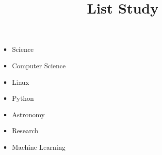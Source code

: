 \documentclass{../template/texnote}
\title{List Study}
\begin{document}
    \maketitle {}
	\begin{itemize}
		\item Science
		\item Computer Science
		\item Linux
		\item Python
		\item Astronomy
		\item Research
		\item Machine Learning
	\end{itemize}
    \printbibliography
\end{document}
